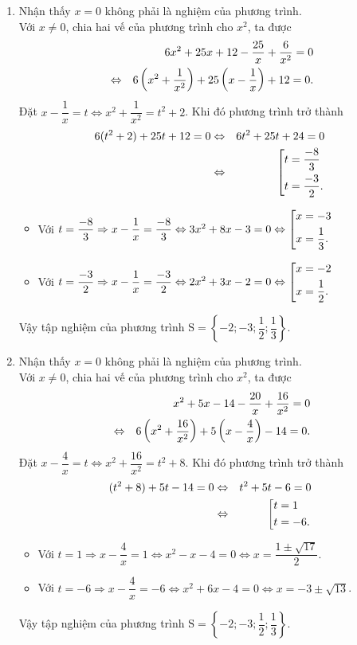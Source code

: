{\begin{enumerate}
\begin{itemize}
		\end{itemize}
		Vậy tập nghiệm của phương trình là $S=\left\lbrace 6;-1; \dfrac{5\pm 3\sqrt{17}}{2}\right\rbrace $.
		\item Nhận thấy $x=0$ không phải là nghiệm của phương trình.\\
			Với $x\ne 0$, chia hai vế của phương trình cho $x^2$, ta được
			\begin{eqnarray}
			&&6x^2+25x+12-\dfrac{25}{x}+\dfrac{6}{x^2}=0\notag\\
			&\Leftrightarrow &6\left( x^2+\dfrac{1}{x^2}\right) +25\left( x-\dfrac{1}{x}\right) +12=0.\notag
			\end{eqnarray}
			Đặt $x-\dfrac{1}{x}=t\Leftrightarrow x^2+\dfrac{1}{x^2}=t^2+2$. Khi đó phương trình trở thành
			\begin{eqnarray}
			6(t^2+2)+25t+12=0&\Leftrightarrow &6t^2+25t+24=0\notag\\
			&\Leftrightarrow &\left[\begin{aligned}&t=\dfrac{-8}{3}\\ &t=\dfrac{-3}{2}.\end{aligned}\right.\notag
			\end{eqnarray}
			\begin{itemize}
				\item Với $t=\dfrac{-8}{3}\Rightarrow x-\dfrac{1}{x}=\dfrac{-8}{3}\Leftrightarrow 3x^2+8x-3=0\Leftrightarrow \left[\begin{aligned}&x=-3\\ &x=\dfrac{1}{3}.\end{aligned}\right.$
				\item Với $t=\dfrac{-3}{2}\Rightarrow x-\dfrac{1}{x}=\dfrac{-3}{2}\Leftrightarrow 2x^2+3x-2=0\Leftrightarrow \left[\begin{aligned}&x=-2\\ &x=\dfrac{1}{2}.\end{aligned}\right.$
			\end{itemize}
		Vậy tập nghiệm của phương trình $\mathrm{S}=\left\lbrace -2;-3;\dfrac{1}{2};\dfrac{1}{3}\right\rbrace $.
		\item Nhận thấy $x=0$ không phải là nghiệm của phương trình.\\
			Với $x\ne 0$, chia hai vế của phương trình cho $x^2$, ta được
			\begin{eqnarray}
			&&x^2+5x-14-\dfrac{20}{x}+\dfrac{16}{x^2}=0\notag\\
			&\Leftrightarrow &6\left( x^2+\dfrac{16}{x^2}\right) +5\left( x-\dfrac{4}{x}\right) -14=0.\notag
			\end{eqnarray}
			Đặt $x-\dfrac{4}{x}=t\Leftrightarrow x^2+\dfrac{16}{x^2}=t^2+8$. Khi đó phương trình trở thành
			\begin{eqnarray}
			(t^2+8)+5t-14=0&\Leftrightarrow &t^2+5t-6=0\notag\\
			&\Leftrightarrow &\left[\begin{aligned}&t=1\\ &t=-6.\end{aligned}\right.\notag
			\end{eqnarray}
			\begin{itemize}
				\item Với $t=1\Rightarrow x-\dfrac{4}{x}=1\Leftrightarrow x^2-x-4=0\Leftrightarrow x=\dfrac{1\pm \sqrt{17}}{2}$.
				\item Với $t=-6\Rightarrow x-\dfrac{4}{x}=-6\Leftrightarrow x^2+6x-4=0\Leftrightarrow x=-3\pm \sqrt{13}$.
			\end{itemize}
		Vậy tập nghiệm của phương trình $\mathrm{S}=\left\lbrace -2;-3;\dfrac{1}{2};\dfrac{1}{3}\right\rbrace $.
		

\end{enumerate}}
